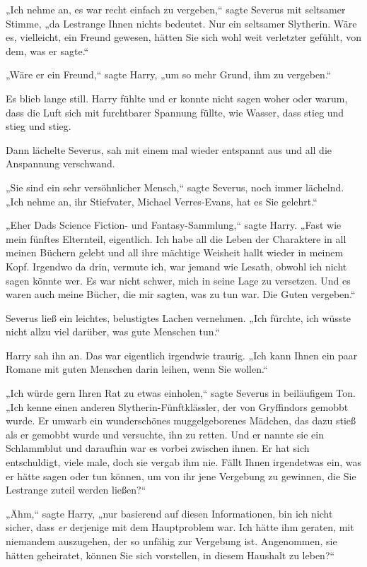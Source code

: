 {„Ich nehme an, es war recht einfach zu vergeben,“ sagte Severus mit seltsamer Stimme, „da Lestrange Ihnen nichts bedeutet. Nur ein seltsamer Slytherin. Wäre es, vielleicht, ein Freund gewesen, hätten Sie sich wohl weit verletzter gefühlt, von dem, was er sagte.“

„Wäre er ein Freund,“ sagte Harry, „um so mehr Grund, ihm zu vergeben.“

Es blieb lange still. Harry fühlte und er konnte nicht sagen woher oder warum, dass die Luft sich mit furchtbarer Spannung füllte, wie Wasser, dass stieg und stieg und stieg.

Dann lächelte Severus, sah mit einem mal wieder entspannt aus und all die Anspannung verschwand.

„Sie sind ein sehr versöhnlicher Mensch,“ sagte Severus, noch immer lächelnd. „Ich nehme an, ihr Stiefvater, Michael Verres-Evans, hat es Sie gelehrt.“

„Eher Dads Science Fiction- und Fantasy-Sammlung,“ sagte Harry. „Fast wie mein fünftes Elternteil, eigentlich. Ich habe all die Leben der Charaktere in all meinen Büchern gelebt und all ihre mächtige Weisheit hallt wieder in meinem Kopf. Irgendwo da drin, vermute ich, war jemand wie Lesath, obwohl ich nicht sagen könnte wer. Es war nicht schwer, mich in seine Lage zu versetzen. Und es waren auch meine Bücher, die mir sagten, was zu tun war. Die Guten vergeben.“

Severus ließ ein leichtes, belustigtes Lachen vernehmen. „Ich fürchte, ich wüsste nicht allzu viel darüber, was gute Menschen tun.“

Harry sah ihn an. Das war eigentlich irgendwie traurig. „Ich kann Ihnen ein paar Romane mit guten Menschen darin leihen, wenn Sie wollen.“

„Ich würde gern Ihren Rat zu etwas einholen,“ sagte Severus in beiläufigem Ton. „Ich kenne einen anderen Slytherin-Fünftklässler, der von Gryffindors gemobbt wurde. Er umwarb ein wunderschönes muggelgeborenes Mädchen, das dazu stieß als er gemobbt wurde und versuchte, ihn zu retten. Und er nannte sie ein Schlammblut und daraufhin war es vorbei zwischen ihnen. Er hat sich entschuldigt, viele male, doch sie vergab ihm nie. Fällt Ihnen irgendetwas ein, was er hätte sagen oder tun können, um von ihr jene Vergebung zu gewinnen, die Sie Lestrange zuteil werden ließen?“

„Ähm,“ sagte Harry, „nur basierend auf diesen Informationen, bin ich nicht sicher, dass \emph{er} derjenige mit dem Hauptproblem war. Ich hätte ihm geraten, mit niemandem auszugehen, der so unfähig zur Vergebung ist. Angenommen, sie hätten geheiratet, können Sie sich vorstellen, in diesem Haushalt zu leben?“

}
